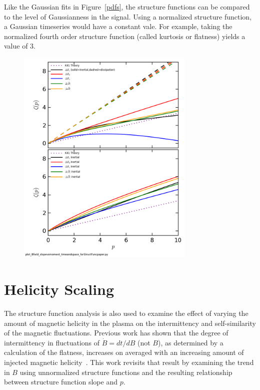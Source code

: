 \documentclass[aps,prl,amsmath,amssymb,reprint,superscriptaddress]{revtex4-1} %
\begin{document}
Like the Gaussian fits in Figure~\ref{pdfs}, the structure functions can be compared to the level of Gaussianness in the signal. Using a normalized structure function, a Gaussian timeseries would have a constant vale. For example, taking the normalized fourth order structure function (called kurtosis or flatness) yields a value of 3. 


\begin{figure}[!htbp]
\centerline{
\includegraphics[width=8.5cm]{Bfield_StructureFunctionSlope_vs_Moment_timeandspace_100313Shots41to80_forStructFuncpaper.png}}
\caption{\label{fig:slopevsmom} }
\end{figure}

\section{Helicity Scaling}

The structure function analysis is also used to examine the effect of varying the amount of magnetic helicity in the plasma on the intermittency and self-similarity of the magnetic fluctuations. Previous work has shown that the degree of intermittency in fluctuations of $\dot{B}=dt/dB$ (not $B$), as determined by a calculation of the flatness, increases on averaged with an increasing amount of injected magnetic helicity~\cite{schaffner2014b}. This work revisits that result by examining the trend in $B$ using unnormalized structure functions and the resulting relationship between structure function slope and $p$. 
\end{document}
